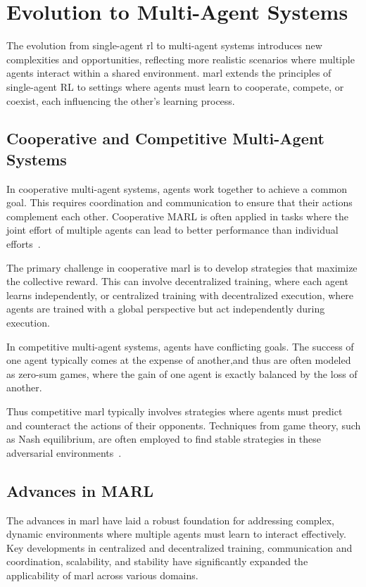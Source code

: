 \section{Evolution to Multi-Agent Systems}

The evolution from single-agent \gls{rl} to multi-agent systems introduces new 
complexities and opportunities, reflecting more realistic scenarios where 
multiple agents interact within a shared environment. 
\Gls{marl} extends the principles of single-agent RL to settings where agents must learn to 
cooperate, compete, or coexist, each influencing the other's learning process.

\subsection*{Cooperative and Competitive Multi-Agent Systems}
In cooperative multi-agent systems, agents work together to achieve a common goal. 
This requires coordination and communication to ensure that their actions complement each other. 
Cooperative MARL is often applied in tasks where the joint effort of multiple agents can lead to 
better performance than individual efforts~\cite{littman1994}.

The primary challenge in cooperative \gls{marl} is to develop strategies that maximize the 
collective reward. This can involve decentralized training, where each agent learns independently, 
or centralized training with decentralized execution, where agents are trained with a global 
perspective but act independently during execution.

In competitive multi-agent systems, agents have conflicting goals. The success of one agent 
typically comes at the expense of another,and thus are often modeled as zero-sum games, 
where the gain of one agent is exactly balanced by the loss of another.

Thus competitive \gls{marl} typically involves strategies where agents must predict and 
counteract the actions of their opponents. Techniques from game theory, such as Nash equilibrium, 
are often employed to find stable strategies in these adversarial environments~\cite{busoniu2008}.

\subsection*{Advances in MARL}
The advances in \gls{marl} have laid a robust foundation for addressing complex, 
dynamic environments where multiple agents must learn to interact effectively.
Key developments in centralized and decentralized training, communication and coordination, 
scalability, and stability have significantly expanded the applicability of 
\gls{marl} across various domains. 

